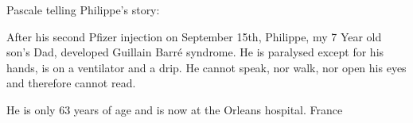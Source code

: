 Pascale telling Philippe’s story:

After his second Pfizer injection on September 15th, Philippe, my 7 Year old
son’s Dad, developed Guillain Barré syndrome. He is paralysed except for his
hands, is on a ventilator and a drip. He cannot speak, nor walk, nor open his
eyes and therefore cannot read.

He is only 63 years of age and is now at the Orleans hospital.
France

